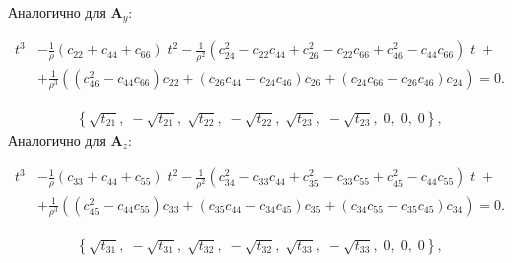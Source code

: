 Аналогично для $\mathbf{A}_y$:
\begin{small}
\begin{align}	
	\label{eigenvalue_equation2}
	t^{3} &- \frac{1}{\rho}(c_{22} + c_{44} + c_{66})\;t^{2} - \frac{1}{\rho^{2}}(c_{24}^{2} - c_{22}c_{44} + c_{26}^{2} - c_{22}c_{66} + c_{46}^{2} - c_{44}c_{66})\;t\;+ \nonumber\\
	&+ \frac{1}{\rho^{3}}((c_{46}^{2} - c_{44}c_{66})c_{22} + (c_{26}c_{44} - c_{24}c_{46})c_{26} + (c_{24}c_{66} - c_{26}c_{46})c_{24}) = 0.
\end{align}
\end{small}
\begin{align}
	\left\{\sqrt{t_{21}},\;-\sqrt{t_{21}},\;\sqrt{t_{22}},\;-\sqrt{t_{22}},\;\sqrt{t_{23}},\;-\sqrt{t_{23}},\;0,\;0,\;0\right\},
\end{align}
Аналогично для $\mathbf{A}_z$:
\begin{small}
\begin{align}	
	\label{eigenvalue_equation3}
	t^{3} &- \frac{1}{\rho}(c_{33} + c_{44} + c_{55})\;t^{2} - \frac{1}{\rho^{2}}(c_{34}^{2} - c_{33}c_{44} + c_{35}^{2} - c_{33}c_{55} + c_{45}^{2} - c_{44}c_{55})\;t\;+ \nonumber\\
	&+ \frac{1}{\rho^{3}}((c_{45}^{2} - c_{44}c_{55})c_{33} + (c_{35}c_{44} - c_{34}c_{45})c_{35} + (c_{34}c_{55} - c_{35}c_{45})c_{34}) = 0.
\end{align}
\end{small}
\begin{align}
	\left\{\sqrt{t_{31}},\;-\sqrt{t_{31}},\;\sqrt{t_{32}},\;-\sqrt{t_{32}},\;\sqrt{t_{33}},\;-\sqrt{t_{33}},\;0,\;0,\;0\right\},
\end{align}
	
